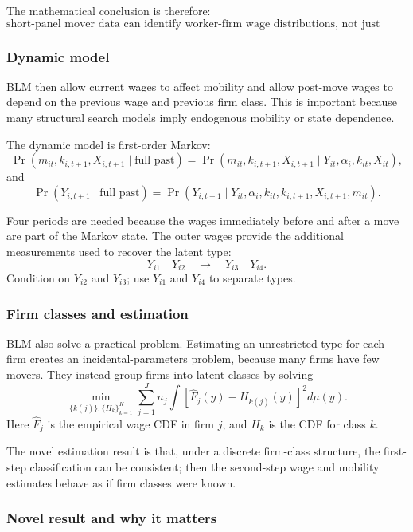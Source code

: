 \documentclass[11pt]{article}
\newcommand{\1}{\mathbf{1}}
\begin{document}
The mathematical conclusion is therefore:
\[
\boxed{
\text{short-panel mover data can identify worker-firm wage distributions, not just additive fixed effects.}
}
\]

\subsubsection*{Dynamic model}

BLM then allow current wages to affect mobility and allow post-move wages to depend on the previous wage and previous firm class. This is important because many structural search models imply endogenous mobility or state dependence.

The dynamic model is first-order Markov:
\[
\Pr(m_{it},k_{i,t+1},X_{i,t+1}\mid \text{full past})
=
\Pr(m_{it},k_{i,t+1},X_{i,t+1}\mid Y_{it},\alpha_i,k_{it},X_{it}),
\]
and
\[
\Pr(Y_{i,t+1}\mid \text{full past})
=
\Pr(Y_{i,t+1}\mid Y_{it},\alpha_i,k_{it},k_{i,t+1},X_{i,t+1},m_{it}).
\]

Four periods are needed because the wages immediately before and after a move are part of the Markov state. The outer wages provide the additional measurements used to recover the latent type:
\[
Y_{i1}
\quad
Y_{i2}
\quad
\longrightarrow
\quad
Y_{i3}
\quad
Y_{i4}.
\]
Condition on $Y_{i2}$ and $Y_{i3}$; use $Y_{i1}$ and $Y_{i4}$ to separate types.

\subsubsection*{Firm classes and estimation}

BLM also solve a practical problem. Estimating an unrestricted type for each firm creates an incidental-parameters problem, because many firms have few movers. They instead group firms into latent classes by solving
\[
\min_{\{k(j)\},\{H_k\}_{k=1}^K}
\sum_{j=1}^J
n_j
\int
\left[
\widehat F_j(y)-H_{k(j)}(y)
\right]^2d\mu(y).
\]
Here $\widehat F_j$ is the empirical wage CDF in firm $j$, and $H_k$ is the CDF for class $k$.

The novel estimation result is that, under a discrete firm-class structure, the first-step classification can be consistent; then the second-step wage and mobility estimates behave as if firm classes were known.

\subsubsection*{Novel result and why it matters}
\end{document}
